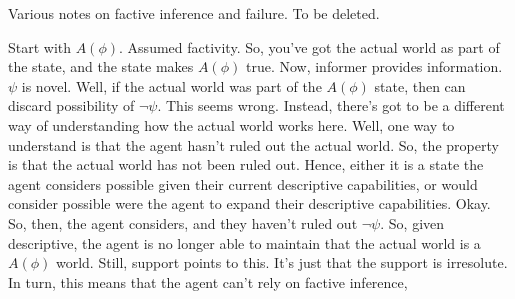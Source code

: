 \documentclass[10pt]{article}
\newcommand{\hozline}[0]{%
  \noindent\hdashrule[0.5ex][c]{\textwidth}{.1pt}{}
}
\begin{document}
\hozline

{
  \color{red}
  Various notes on factive inference and failure.
  To be deleted.
}

\begin{note}[Example]
  Start with \(A(\phi)\).
  Assumed factivity.
  So, you've got the actual world as part of the state, and the state makes \(A(\phi)\) true.
  Now, informer provides information.
  \(\psi\) is novel.
  Well, if the actual world was part of the \(A(\phi)\) state, then can discard possibility of \(\lnot\psi\).
  This seems wrong.
  Instead, there's got to be a different way of understanding how the actual world works here.
  Well, one way to understand is that the agent hasn't ruled out the actual world.
  So, the property is that the actual world has not been ruled out.
  Hence, either it is a state the agent considers possible given their current descriptive capabilities, or would consider possible were the agent to expand their descriptive capabilities.
  Okay.
  So, then, the agent considers, and they haven't ruled out \(\lnot\psi\).
  So, given descriptive, the agent is no longer able to maintain that the actual world is a \(A(\phi)\) world.
  Still, support points to this.
  It's just that the support is irresolute.
  In turn, this means that the agent can't rely on factive inference, 
\end{note}
\end{document}
